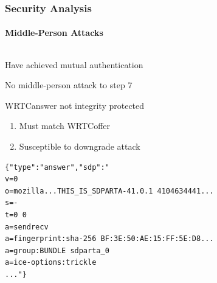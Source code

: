 \documentclass[handout, notes=hide]{beamer}
\begin{document}


\begin{frame}[fragile]
\frametitle{Security Analysis}
\framesubtitle{Middle-Person Attacks}

\begin{columns}[T]
\begin{column}[T]{0.6\textwidth}
\setlength{\parskip}{0.5em}
Have achieved mutual authentication

No middle-person attack to step 7

WRTCanswer not integrity protected
\begin{enumerate}
\item Must match WRTCoffer
\item Susceptible to downgrade attack
\end{enumerate}
\setlength{\fboxrule}{10.0em}
\begin{snugshade}
\begin{tiny}
\begin{verbatim}{"type":"answer","sdp":"
v=0
o=mozilla...THIS_IS_SDPARTA-41.0.1 4104634441...
s=-
t=0 0
a=sendrecv
a=fingerprint:sha-256 BF:3E:50:AE:15:FF:5E:D8...
a=group:BUNDLE sdparta_0
a=ice-options:trickle
..."}
\end{verbatim}
\end{tiny}
\end{snugshade}


\end{column}
\end{columns}
\end{frame}
\end{document}
